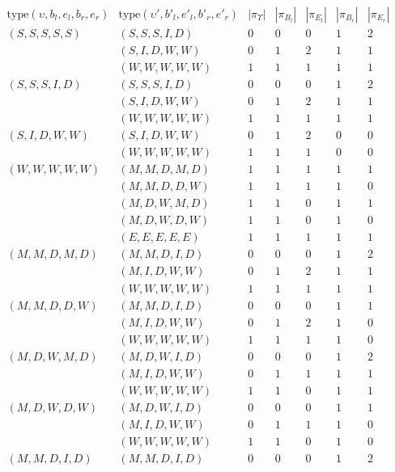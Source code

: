 \documentclass{article}
\newcommand\idfork{\Upsilon}
\newcommand\statetype{\mbox{type}}
\newcommand\hstate{(\upsilon,b_l,e_l,b_r,e_r)}
\newcommand\hstatedest{(\upsilon',b'_l,e'_l,b'_r,e'_r)}
\begin{document}
\begin{table}
\[
\begin{array}{ll|ccccc}
\statetype\hstate & \statetype\hstatedest & |\pi_{\idfork}| & |\pi_{B_l}| & |\pi_{E_l}| & |\pi_{B_r}| & |\pi_{E_r}| \\
\hline
(S,S,S,S,S) & (S,S,S,I,D) & 0 & 0 & 0 & 1 & 2 \\
            & (S,I,D,W,W) & 0 & 1 & 2 & 1 & 1 \\
            & (W,W,W,W,W) & 1 & 1 & 1 & 1 & 1 \\
\hline
(S,S,S,I,D) & (S,S,S,I,D) & 0 & 0 & 0 & 1 & 2 \\
            & (S,I,D,W,W) & 0 & 1 & 2 & 1 & 1 \\
            & (W,W,W,W,W) & 1 & 1 & 1 & 1 & 1 \\
\hline
(S,I,D,W,W) & (S,I,D,W,W) & 0 & 1 & 2 & 0 & 0 \\
            & (W,W,W,W,W) & 1 & 1 & 1 & 0 & 0 \\
\hline
(W,W,W,W,W) & (M,M,D,M,D) & 1 & 1 & 1 & 1 & 1 \\
            & (M,M,D,D,W) & 1 & 1 & 1 & 1 & 0 \\
            & (M,D,W,M,D) & 1 & 1 & 0 & 1 & 1 \\
            & (M,D,W,D,W) & 1 & 1 & 0 & 1 & 0 \\
            & (E,E,E,E,E) & 1 & 1 & 1 & 1 & 1 \\
\hline
(M,M,D,M,D) & (M,M,D,I,D) & 0 & 0 & 0 & 1 & 2 \\
            & (M,I,D,W,W) & 0 & 1 & 2 & 1 & 1 \\
            & (W,W,W,W,W) & 1 & 1 & 1 & 1 & 1 \\
\hline
(M,M,D,D,W) & (M,M,D,I,D) & 0 & 0 & 0 & 1 & 1 \\
            & (M,I,D,W,W) & 0 & 1 & 2 & 1 & 0 \\
            & (W,W,W,W,W) & 1 & 1 & 1 & 1 & 0 \\
\hline
(M,D,W,M,D) & (M,D,W,I,D) & 0 & 0 & 0 & 1 & 2 \\
            & (M,I,D,W,W) & 0 & 1 & 1 & 1 & 1 \\
            & (W,W,W,W,W) & 1 & 1 & 0 & 1 & 1 \\
\hline
(M,D,W,D,W) & (M,D,W,I,D) & 0 & 0 & 0 & 1 & 1 \\
            & (M,I,D,W,W) & 0 & 1 & 1 & 1 & 0 \\
            & (W,W,W,W,W) & 1 & 1 & 0 & 1 & 0 \\
\hline
(M,M,D,I,D) & (M,M,D,I,D) & 0 & 0 & 0 & 1 & 2 \\

\end{array}\]
\end{table}
\end{document}
